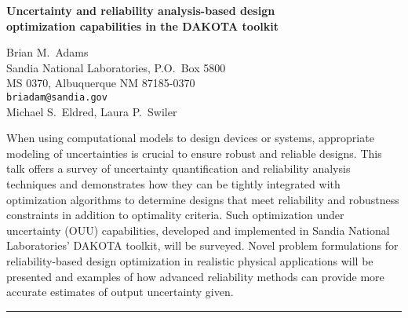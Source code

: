 \documentclass[twosided]{report}
\begin{document}
\begin{center}
{\large			%
{\bf Uncertainty and reliability analysis-based design \\
optimization capabilities in the DAKOTA toolkit }}

	Brian M.~Adams \\
	Sandia National Laboratories, P.O.~Box 5800 \\
	MS 0370, Albuquerque NM 87185-0370 \\
	{\tt briadam@sandia.gov} \\
	Michael S.~Eldred, Laura P.~Swiler
\end{center}
When using computational models to design devices or systems,
appropriate modeling of uncertainties is crucial to ensure robust and
reliable designs.  This talk offers a survey of uncertainty
quantification and reliability analysis techniques and demonstrates
how they can be tightly integrated with optimization algorithms to
determine designs that meet reliability and robustness constraints in
addition to optimality criteria.  Such optimization under uncertainty
(OUU) capabilities, developed and implemented in Sandia National
Laboratories' DAKOTA toolkit, will be surveyed.  Novel problem
formulations for reliability-based design optimization in realistic
physical applications will be presented and examples of how advanced
reliability methods can provide more accurate estimates of output
uncertainty given.



	\begin{center} \rule{6in}{1pt} \end{center}
\end{document}
